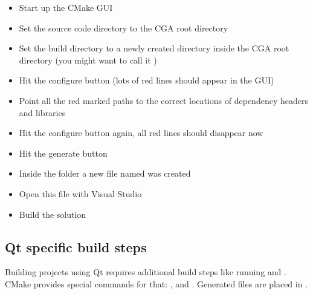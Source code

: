\begin{itemize}
	\item Start up the CMake GUI
	\item Set the source code directory to the CGA root directory
    \item Set the build directory to a newly created directory inside the CGA root directory (you might want to call it )
    \item Hit the configure button (lots of red lines should appear in the GUI)
    \item Point all the red marked paths to the correct locations of dependency headers and libraries
    \item Hit the configure button again, all red lines should disappear now
    \item Hit the generate button
    \item Inside the  folder a new file named  was created
    \item Open this file with Visual Studio
    \item Build the solution
\end{itemize}



\subsection{Qt specific build steps} Building projects using Qt requires additional build steps like running  and . CMake provides special commands for that: ,  and . Generated files are placed in .
